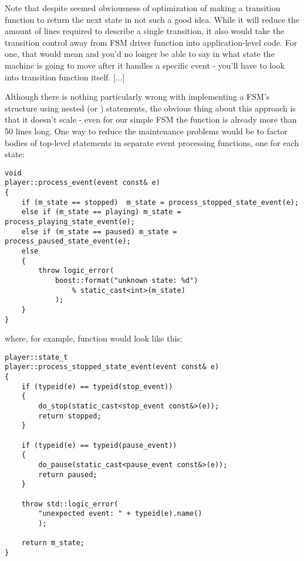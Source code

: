 \documentclass{kapproc}
\begin{document}
Note that despite seemed obviousness of optimization of making 
a transition function to return the next state in not such a 
good idea. While it will reduce the amount of lines required 
to describe a single transition, it also would take the 
transition control away from FSM driver function into 
application-level code. For one, that would mean and you'd no 
longer be able to say in what state the machine is going to 
move after it handles a specific event - you'll have to look 
into transition function itself. [...] 

Although there is nothing particularly wrong with implementing 
a FSM's structure using nested  (or )
statements, the obvious thing about this approach is that it 
doesn't scale - even for our simple FSM the 
 function is already more than 50 lines
long. One way to reduce the maintenance problems would be to 
factor bodies of top-level  statements in separate 
event processing functions, one for each state:


{\small
\begin{codesamp}\begin{verbatim}
void
player::process_event(event const& e)
{
    if (m_state == stopped)  m_state = process_stopped_state_event(e);
    else if (m_state == playing) m_state = process_playing_state_event(e);
    else if (m_state == paused) m_state = process_paused_state_event(e);
    else
    {
        throw logic_error(
            boost::format("unknown state: %d")
                % static_cast<int>(m_state)
            );
    }
}
\end{verbatim}
\end{codesamp}
}

where, for example,  
function would look like this:

{\small
\begin{codesamp}\begin{verbatim}
player::state_t
player::process_stopped_state_event(event const& e)
{
    if (typeid(e) == typeid(stop_event))
    {
        do_stop(static_cast<stop_event const&>(e));
        return stopped;
    }

    if (typeid(e) == typeid(pause_event))
    {
        do_pause(static_cast<pause_event const&>(e));
        return paused;
    }

    throw std::logic_error(
        "unexpected event: " + typeid(e).name()
        );

    return m_state;
}
\end{verbatim}
\end{codesamp}
}
\end{document}
